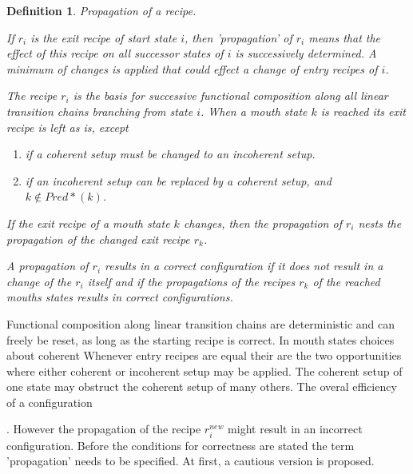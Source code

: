 \documentclass[12pt,a4paper]{scrartcl}
\newtheorem{definition}{Definition}
\begin{document}
\begin{definition} Propagation of a recipe.
    
    If $r_i$ is the exit recipe of start state $i$, then 'propagation'
    of $r_i$ means that the effect of this recipe on all successor states of
    $i$ is successively determined. A minimum of changes is applied that could
    effect a change of entry recipes of $i$.

    The recipe $r_i$ is the basis for successive functional composition along
    all linear transition chains branching from state $i$. When a mouth state
    $k$ is reached its exit recipe is left as is, except 

    \begin{enumerate}
       \item if a coherent setup must be changed to an incoherent setup.
       \item if an incoherent setup can be replaced by a coherent setup, 
             and $k\notin Pred*(k)$.
    \end{enumerate}
    
    If the exit recipe of a  mouth state $k$ changes, then the propagation of
    $r_i$ nests the propagation of the changed exit recipe $r_k$. 

    A propagation of $r_i$ results in a correct configuration if it does not
    result in a change of the $r_i$ itself and if the propagations of the
    recipes $r_k$ of the reached mouths states results in correct
    configurations.

\end{definition}

Functional composition along linear transition chains are deterministic
and can freely be reset, as long as the starting recipe is correct. 
In mouth states choices about coherent 
Whenever entry recipes are equal their are the two opportunities where
either coherent or incoherent setup may be applied. The coherent setup of
one state may obstruct the coherent setup of many others. The overal 
efficiency of a configuration 


.  However the propagation of the
recipe $r^{new}_i$ might result in an incorrect configuration.  Before the
conditions for correctness are stated the term 'propagation' needs to be
specified. At first, a cautious version is proposed.
\end{document}
